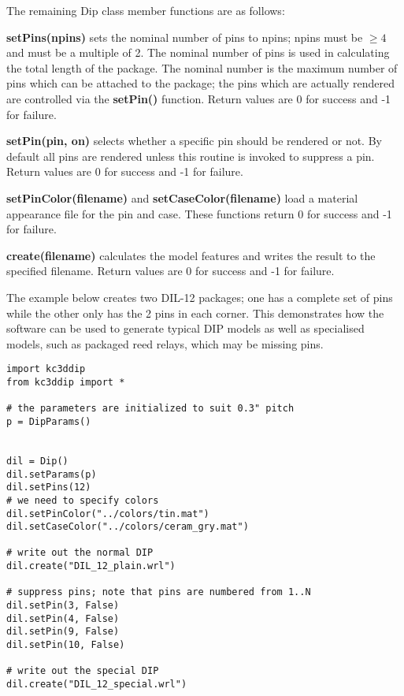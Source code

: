 The remaining Dip class member functions are as follows:

\textbf{setPins(npins)} sets the nominal number of pins to npins; npins must
be $\ge4$ and must be a multiple of 2. The nominal number of pins is used in
calculating the total length of the package. The nominal number is the maximum
number of pins which can be attached to the package; the pins which are
actually rendered are controlled via the \textbf{setPin()} function.
Return values are 0 for success and -1 for failure.

\textbf{setPin(pin, on)} selects whether a specific pin should be rendered or
not. By default all pins are rendered unless this routine is invoked to suppress
a pin. Return values are 0 for success and -1 for failure.

\textbf{setPinColor(filename)} and \textbf{setCaseColor(filename)} load
a material appearance file for the pin and case. These functions return 0
for success and -1 for failure.

\textbf{create(filename)} calculates the model features and writes the
result to the specified filename. Return values are 0 for success and -1 for failure.

The example below creates two DIL-12 packages; one has a complete set of pins while
the other only has the 2 pins in each corner. This demonstrates how the software
can be used to generate typical DIP models as well as specialised models, such as
packaged reed relays, which may be missing pins.

\begin{verbatim}
import kc3ddip
from kc3ddip import *

# the parameters are initialized to suit 0.3" pitch
p = DipParams()


dil = Dip()
dil.setParams(p)
dil.setPins(12)
# we need to specify colors
dil.setPinColor("../colors/tin.mat")
dil.setCaseColor("../colors/ceram_gry.mat")

# write out the normal DIP
dil.create("DIL_12_plain.wrl")

# suppress pins; note that pins are numbered from 1..N
dil.setPin(3, False)
dil.setPin(4, False)
dil.setPin(9, False)
dil.setPin(10, False)

# write out the special DIP
dil.create("DIL_12_special.wrl")
\end{verbatim}



